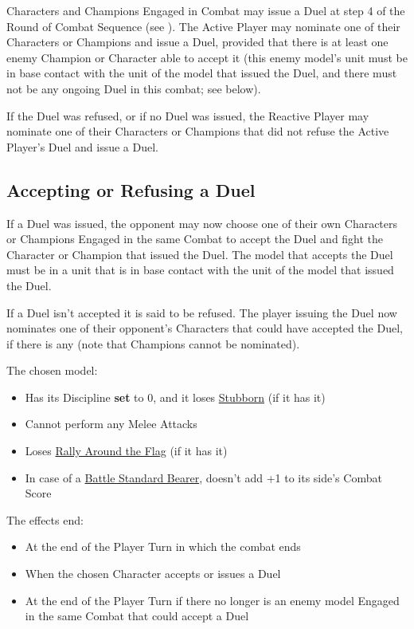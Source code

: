 Characters and Champions Engaged in Combat may issue a Duel at step 4 of the Round of Combat Sequence (see ). The Active Player may nominate one of their Characters or Champions and issue a Duel, provided that there is at least one enemy Champion or Character able to accept it (this enemy model's unit must be in base contact with the unit of the model that issued the Duel, and there must not be any ongoing Duel in this combat; see below).

If the Duel was refused, or if no Duel was issued, the Reactive Player may nominate one of their Characters or Champions that did not refuse the Active Player's Duel and issue a Duel.

\subsection{Accepting or Refusing a Duel}
\label{accepting_and_refusing_a_duel}

If a Duel was issued, the opponent may now choose one of their own Characters or Champions Engaged in the same Combat to accept the Duel and fight the Character or Champion that issued the Duel. The model that accepts the Duel must be in a unit that is in base contact with the unit of the model that issued the Duel.

If a Duel isn't accepted it is said to be refused. The player issuing the Duel now nominates one of their opponent's Characters that could have accepted the Duel, if there is any (note that Champions cannot be nominated).

The chosen model:
\begin{itemize}
	\item Has its Discipline \textbf{set} to 0, and it loses \hyperref[stubborn]{Stubborn} (if it has it)
	\item Cannot perform any Melee Attacks
	\item Loses \hyperref[rally_around_the_flag]{Rally Around the Flag} (if it has it)
	\item In case of a \hyperref[bsb]{Battle Standard Bearer}, doesn't add +1 to its side's Combat Score
\end{itemize}

The effects end:
\begin{itemize}
	\item At the end of the Player Turn in which the combat ends
	\item When the chosen Character accepts or issues a Duel
	\item At the end of the Player Turn if there no longer is an enemy model Engaged in the same Combat that could accept a Duel
\end{itemize}

